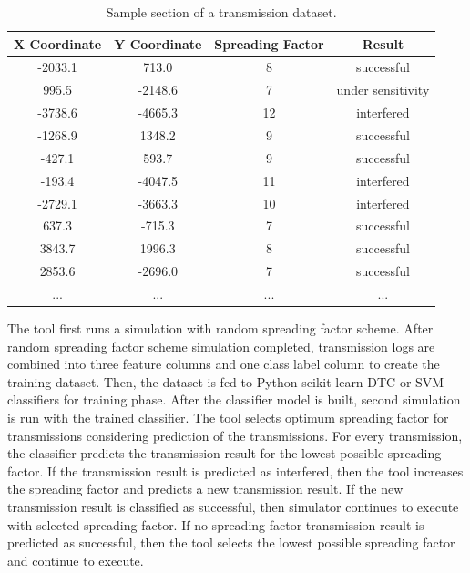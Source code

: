 \begin{table}
\centering
\caption{Sample section of a transmission dataset.}
\label{table:dataset}
\begin{tabular}{|c|c|c|c|}
\hline
\textbf{X Coordinate} & \textbf{Y Coordinate} & \textbf{Spreading Factor} & \textbf{Result} \\ \hline
      -2033.1  &  713.0  &   8   &   successful \\ \hline
       995.5   & -2148.6 &   7   &   under sensitivity \\ \hline
      -3738.6  & -4665.3 &   12  &   interfered \\ \hline
      -1268.9  &  1348.2 &   9   &   successful \\ \hline
      -427.1   &  593.7  &   9   &   successful \\ \hline
      -193.4   & -4047.5 &   11  &   interfered \\ \hline
      -2729.1  & -3663.3 &   10  &   interfered \\ \hline
       637.3   & -715.3 &   7   &   successful \\ \hline
       3843.7  &  1996.3 &   8   &   successful \\ \hline
       2853.6  & -2696.0 &   7   &   successful \\ \hline
      ...      & ...     &   ... &   ... \\ \hline
\end{tabular}
\end{table}

The tool first runs a simulation with random spreading factor scheme. After random spreading factor scheme simulation completed, transmission logs are combined into three feature columns and one class label column to create the training dataset. Then, the dataset is fed to Python scikit-learn DTC or SVM classifiers for training phase. After the classifier model is built, second simulation is run with the trained classifier. The tool selects optimum spreading factor for transmissions considering prediction of the transmissions. For every transmission, the classifier predicts the transmission result for the lowest possible spreading factor. If the transmission result is predicted as interfered, then the tool increases the spreading factor and predicts a new transmission result. If the new transmission result is classified as successful, then simulator continues to execute with selected spreading factor. If no spreading factor transmission result is predicted as successful, then the tool selects the lowest possible spreading factor and continue to execute.

